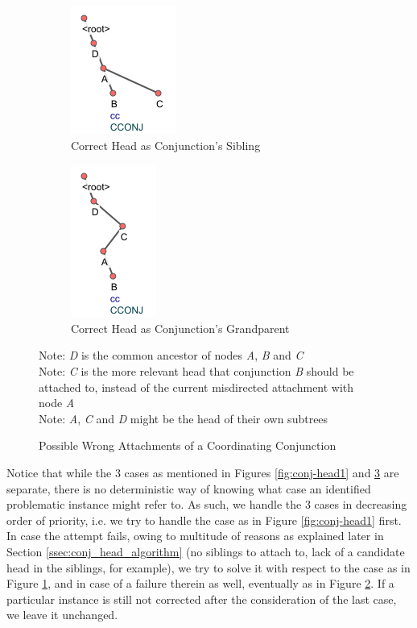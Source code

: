 \begin{figure}[H]
\begin{subfigure}{.45\textwidth}
  \centering
  \includegraphics{img/nested2.png}
  \caption{Correct Head as Conjunction's Sibling}
  \label{fig:conj-head2}
  \end{subfigure}
\begin{subfigure}{.5\textwidth}
  \centering
  \includegraphics{img/nested3.png}
  \caption{Correct Head as Conjunction's Grandparent}
  \label{fig:conj-head3}
\end{subfigure}
\caption{Possible Wrong Attachments of a Coordinating Conjunction}
Note: \textit{D} is the common ancestor of nodes \textit{A}, \textit{B} and \textit{C}\\
Note: \textit{C} is the more relevant head that conjunction \textit{B} should be attached to, instead of the current misdirected attachment with node \textit{A}\\
Note: \textit{A}, \textit{C} and \textit{D} might be the head of their own subtrees
\label{fig:conj-head23}
\end{figure}

Notice that while the 3 cases as mentioned in Figures \ref{fig:conj-head1} and \ref{fig:conj-head23} are separate, there is no deterministic way of knowing what case an identified problematic instance might refer to. As such, we handle the 3 cases in decreasing order of priority, i.e. we try to handle the case as in Figure \ref{fig:conj-head1} first. In case the attempt fails, owing to multitude of reasons as explained later in Section \ref{ssec:conj_head_algorithm} (no siblings to attach to, lack of a candidate head in the siblings, for example), we try to solve it with respect to the case as in Figure \ref{fig:conj-head2}, and in case of a failure therein as well, eventually as in Figure \ref{fig:conj-head3}. If a particular instance is still not corrected after the consideration of the last case, we leave it unchanged.

